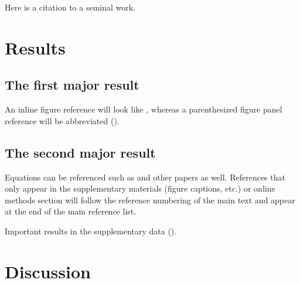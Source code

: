 
Here is a citation to a seminal work\cite{OKeeNade78a}. \lipsum[2-3]

\section*{Results}

\subsection*{The first major result}

An inline figure reference will look like , whereas a parenthesized figure panel
reference will be abbreviated ().  \lipsum[4]

\subsection*{The second major result}

Equations can be referenced such as  and other papers as well\cite{Hill78a}. References
that only appear in the supplementary materials (figure captions, etc.) or online methods section
will follow the reference numbering of the main text and appear at the end of the main reference
list. \lipsum[5]

Important results in the supplementary data (). \lipsum[6]

\section*{Discussion}

\lipsum[7-9]


